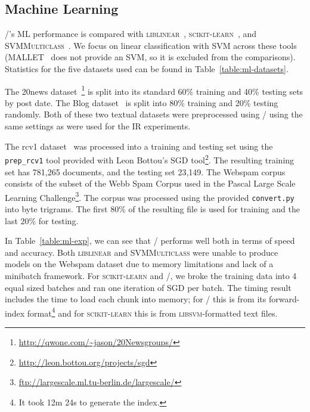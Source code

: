 





\subsection{Machine Learning}

\meta/'s ML performance is compared with
\textsc{liblinear}~\cite{liblinear}, \textsc{scikit-learn}~\cite{scikit},
and \textsc{SVMMulticlass}~\cite{svmmulticlass}. We focus on linear
classification with SVM across these tools (MALLET~\cite{mallet} does not
provide an SVM, so it is excluded from the comparisons). Statistics for the
five datasets used can be found in Table~\ref{table:ml-datasets}.

The 20news
dataset~\cite{Lang:1995:ICML}\footnote{\url{http://qwone.com/~jason/20Newsgroups/}}
is split into its standard 60\% training and 40\% testing sets by post
date. The Blog dataset~\cite{blog} is split into 80\% training and 20\%
testing randomly. Both of these two textual datasets were preprocessed
using \meta/ using the same settings as were used for the IR experiments.

The rcv1 dataset~\cite{rcv1} was processed into a training and testing set
using the \texttt{prep\_rcv1} tool provided with Leon Bottou's SGD
tool\footnote{\url{http://leon.bottou.org/projects/sgd}}. The resulting
training set has 781,265 documents, and the testing set 23,149. The Webspam
corpus~\cite{Webb:2006:CEAS} consists of the subset of the Webb Spam Corpus
used in the Pascal Large Scale Learning
Challenge\footnote{\url{ftp://largescale.ml.tu-berlin.de/largescale/}}.
The corpus was processed using the provided \texttt{convert.py} into byte
trigrams. The first 80\% of the resulting file is used for training and the
last 20\% for testing.

In Table~\ref{table:ml-exp}, we can see that \meta/ performs well both in
terms of speed and accuracy. Both \textsc{liblinear} and
\textsc{SVMMulticlass} were unable to produce models on the Webspam dataset
due to memory limitations and lack of a minibatch framework. For
\textsc{scikit-learn} and \meta/, we broke the training data into 4 equal
sized batches and ran one iteration of SGD per batch. The timing result
includes the time to load each chunk into memory; for \meta/ this is from
its forward-index format\footnote{It took 12m 24s to generate the index.}
and for \textsc{scikit-learn} this is from \textsc{libsvm}-formatted text
files.



